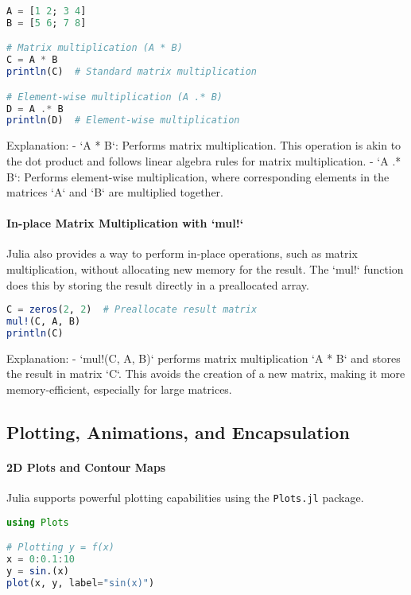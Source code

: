\begin{lstlisting}[language=Julia]
A = [1 2; 3 4]
B = [5 6; 7 8]

# Matrix multiplication (A * B)
C = A * B
println(C)  # Standard matrix multiplication

# Element-wise multiplication (A .* B)
D = A .* B
println(D)  # Element-wise multiplication
\end{lstlisting}

Explanation:
- `A * B`: Performs matrix multiplication. This operation is akin to the dot product and follows linear algebra rules for matrix multiplication.
- `A .* B`: Performs element-wise multiplication, where corresponding elements in the matrices `A` and `B` are multiplied together.

\paragraph{In-place Matrix Multiplication with `mul!`}
Julia also provides a way to perform in-place operations, such as matrix multiplication, without allocating new memory for the result. The `mul!` function does this by storing the result directly in a preallocated array.

\begin{lstlisting}[language=Julia]
C = zeros(2, 2)  # Preallocate result matrix
mul!(C, A, B)
println(C)
\end{lstlisting}

Explanation:
- `mul!(C, A, B)` performs matrix multiplication `A * B` and stores the result in matrix `C`. This avoids the creation of a new matrix, making it more memory-efficient, especially for large matrices.

\subsection{Plotting, Animations, and Encapsulation}

\paragraph{2D Plots and Contour Maps}
Julia supports powerful plotting capabilities using the \texttt{Plots.jl} package.

\begin{lstlisting}[language=Julia]
using Plots

# Plotting y = f(x)
x = 0:0.1:10
y = sin.(x)
plot(x, y, label="sin(x)")
\end{lstlisting}


